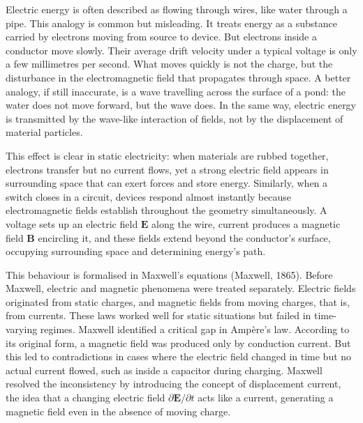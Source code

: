 Electric energy is often described as flowing through wires, like water through a pipe. This analogy is common but misleading. It treats energy as a substance carried by electrons moving from source to device. But electrons inside a conductor move slowly. Their average drift velocity under a typical voltage is only a few millimetres per second. What moves quickly is not the charge, but the disturbance in the electromagnetic field that propagates through space. A better analogy, if still inaccurate, is a wave travelling across the surface of a pond: the water does not move forward, but the wave does. In the same way, electric energy is transmitted by the wave-like interaction of fields, not by the displacement of material particles.

This effect is clear in static electricity: when materials are rubbed together, electrons transfer but no current flows, yet a strong electric field appears in surrounding space that can exert forces and store energy. Similarly, when a switch closes in a circuit, devices respond almost instantly because electromagnetic fields establish throughout the geometry simultaneously. A voltage sets up an electric field $\mathbf{E}$ along the wire, current produces a magnetic field $\mathbf{B}$ encircling it, and these fields extend beyond the conductor's surface, occupying surrounding space and determining energy's path.

This behaviour is formalised in Maxwell's equations (Maxwell, 1865). Before Maxwell, electric and magnetic phenomena were treated separately. Electric fields originated from static charges, and magnetic fields from moving charges, that is, from currents. These laws worked well for static situations but failed in time-varying regimes. Maxwell identified a critical gap in Ampère's law. According to its original form, a magnetic field was produced only by conduction current. But this led to contradictions in cases where the electric field changed in time but no actual current flowed, such as inside a capacitor during charging. Maxwell resolved the inconsistency by introducing the concept of displacement current, the idea that a changing electric field $\partial \mathbf{E}/\partial t$ acts like a current, generating a magnetic field even in the absence of moving charge.

